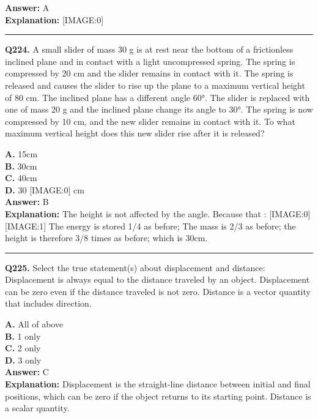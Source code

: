 \documentclass[12pt]{article}
\begin{document}
\textbf{Answer:} A \\
\textbf{Explanation:} [IMAGE:0]

\hrule
\vspace{1em}


\noindent
\textbf{Q224.} A small slider of mass 30 g is at rest near the bottom of a frictionless inclined plane and in contact with a light uncompressed spring. The spring is compressed by 20 cm and the slider remains in contact with it. The spring is released and causes the slider to rise up the plane to a maximum vertical height of 80 cm. The inclined plane has a different angle 60°. The slider is replaced with one of mass 20 g and the inclined plane change its angle to 30°. The spring is now compressed by 10 cm, and the new slider remains in contact with it. To what maximum vertical height does this new slider rise after it is released?



\textbf{A.} 15cm \\
\textbf{B.} 30cm \\
\textbf{C.} 40cm \\
\textbf{D.} 30
[IMAGE:0]
cm \\

\textbf{Answer:} B \\
\textbf{Explanation:} The height is not affected by the angle. Because that
:
[IMAGE:0]
[IMAGE:1]
The energy is stored 1/4 as before; The mass is 2/3 as before; the height is therefore 3/8 times as before; which is 30cm.

\hrule
\vspace{1em}


\noindent
\textbf{Q225.} Select the true statement(s) about displacement and distance:
Displacement is always equal to the distance traveled by an object.
Displacement can be zero even if the distance traveled is not zero.
Distance is a vector quantity that includes direction.



\textbf{A.} All of above \\
\textbf{B.} 1 only \\
\textbf{C.} 2 only \\
\textbf{D.} 3 only \\

\textbf{Answer:} C \\
\textbf{Explanation:} Displacement is the straight-line distance between initial and final positions, which can be zero if the object returns to its starting point. Distance is a scalar quantity.
\end{document}
